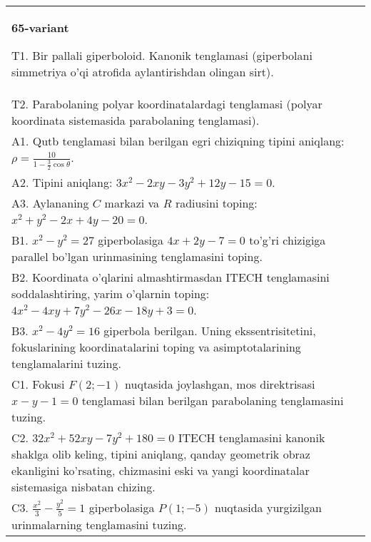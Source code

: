 \documentclass{article}
\begin{document}
\begin{tabular}{m{17cm}}
\textbf{65-variant}
\newline

T1. Bir pallali giperboloid. Kanonik tenglamasi (giperbolani simmetriya o'qi atrofida aylantirishdan olingan sirt).\\

T2. Parabolaning polyar koordinatalardagi tenglamasi (polyar koordinata sistemasida parabolaning tenglamasi).\\

A1. Qutb tenglamasi bilan berilgan egri chiziqning tipini aniqlang: $\rho=\frac{10}{1-\frac{3}{2}\cos\theta}$.\\

A2. Tipini aniqlang: $3x^{2}-2xy-3y^{2}+12y-15=0$.\\

A3. Aylananing $C$ markazi va $R$ radiusini toping: $x^2+y^2-2x+4y-20=0$.\\

B1. $x^{2} - y^{2} = 27$ giperbolasiga $4x + 2y - 7 = 0$ to'g'ri chizigiga parallel bo'lgan urinmasining tenglamasini toping.  \\

B2. Koordinata o'qlarini almashtirmasdan ITECH tenglamasini soddalashtiring, yarim o'qlarnin toping: $4x^{2} - 4xy + 7y^{2} - 26x - 18y + 3 = 0$.\\

B3. $x^{2} - 4y^{2} = 16$ giperbola berilgan. Uning ekssentrisitetini, fokuslarining koordinatalarini toping va asimptotalarining tenglamalarini tuzing.\\

C1. Fokusi $F(2; - 1)$ nuqtasida joylashgan, mos direktrisasi $x - y - 1 = 0$ tenglamasi bilan berilgan parabolaning tenglamasini tuzing.  \\

C2. $32x^{2} + 52xy - 7y^{2} + 180 = 0$ ITECH tenglamasini kanonik shaklga olib keling, tipini aniqlang, qanday geometrik obraz ekanligini ko'rsating, chizmasini eski va yangi koordinatalar sistemasiga nisbatan chizing.  \\

C3. $\frac{x^{2}}{3} - \frac{y^{2}}{5} = 1$ giperbolasiga $P(1; - 5)$ nuqtasida yurgizilgan urinmalarning tenglamasini tuzing.\\

\end{tabular}
\vspace{1cm}
\end{document}
